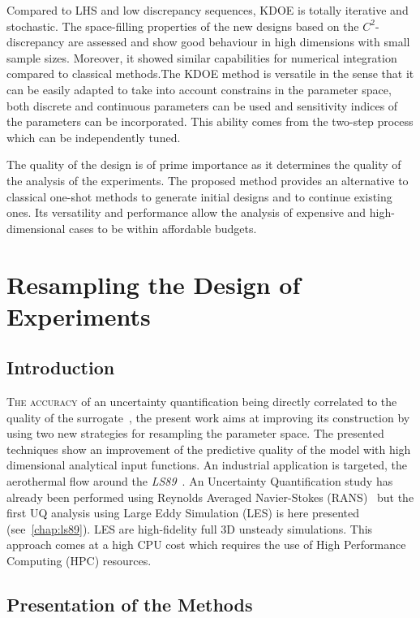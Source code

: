 Compared to LHS and low discrepancy sequences, KDOE is totally iterative and stochastic. The space-filling properties of the new designs based on the $C^2$-discrepancy are assessed and show good behaviour in high dimensions with small sample sizes. Moreover, it showed similar capabilities for numerical integration compared to classical methods.The KDOE method is versatile in the sense that it can be easily adapted to take into account constrains in the parameter space, both discrete and continuous parameters can be used and sensitivity indices of the parameters can be incorporated. This ability comes from the two-step process which can be independently tuned.

The quality of the design is of prime importance as it determines the quality of the analysis of the experiments. The proposed method provides an alternative to classical one-shot methods to generate initial designs and to continue existing ones. Its versatility and performance allow the analysis of expensive and high-dimensional cases to be within affordable budgets.


\chapter{Resampling the Design of Experiments}\label{chap:resample}
\section{Introduction}

\lettrine{T}{he accuracy} of an uncertainty quantification being directly correlated to the quality of the surrogate~\cite{iooss2010}, the present work aims at improving its construction by using two new strategies for resampling the parameter space. The presented techniques show an improvement of the predictive quality of the model with high dimensional analytical input functions. An industrial application is targeted, the aerothermal flow around the \textit{LS89}~\cite{arts1990}. An Uncertainty Quantification study has already been performed using Reynolds Averaged Navier-Stokes (RANS)~\cite{Gourdain2010,emory2016} but the first UQ analysis using Large Eddy Simulation (LES) is here presented (see~\cref{chap:ls89}). LES are high-fidelity full 3D unsteady simulations. This approach comes at a high CPU cost which requires the use of High Performance Computing (HPC) resources.

\section{Presentation of the Methods}

